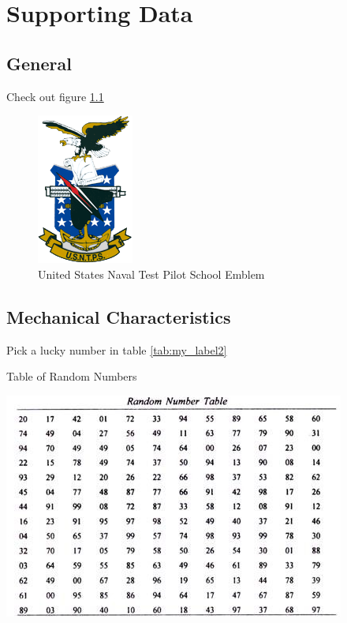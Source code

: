 \chapter{Supporting Data}\label{ch:Data}

\section{General}\label{sec:SupportingGeneral}
\p Check out figure \ref{fig:my_label1} \pp \label{par:SupportingGeneral}

\begin{figure}[htb]
    \centering
    \includegraphics[width=0.4\columnwidth]{figures/usntps.png}
    \caption{United States Naval Test Pilot School Emblem}
    \label{fig:my_label1}
\end{figure}

\pagebreak

\section{Mechanical Characteristics}\label{sec:MechChar}
\p Pick a lucky number in table \ref{tab:my_label2} \pp \label{par:MechChar}

\begin{table}[htb]
    \caption{Table of Random Numbers}
    \label{tab:my_label2}    
    \centering
    \includegraphics{tables/table.png}
\end{table}

\pagebreak
